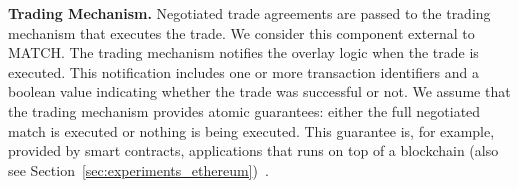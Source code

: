 \textbf{Trading Mechanism.}
Negotiated trade agreements are passed to the trading mechanism that executes the trade.
We consider this component external to MATCH.
The trading mechanism notifies the overlay logic when the trade is executed.
This notification includes one or more transaction identifiers and a boolean value indicating whether the trade was successful or not.
We assume that the trading mechanism provides atomic guarantees: either the full negotiated match is executed or nothing is being executed.
This guarantee is, for example, provided by smart contracts, applications that runs on top of a blockchain (also see Section~\ref{sec:experiments_ethereum})~\cite{luu2016making}.




